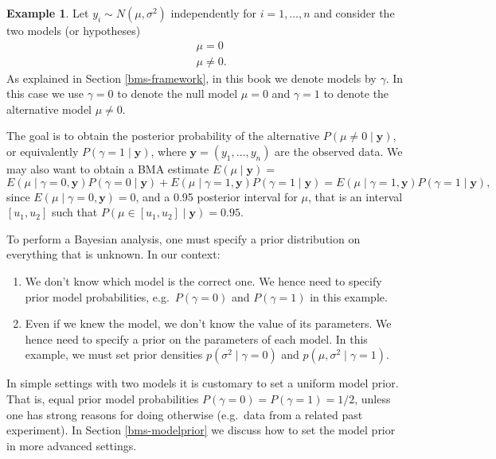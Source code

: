 \documentclass[
]{book}
\newcommand{\by}{\mathbf{y}}
\theoremstyle{definition}
\theoremstyle{definition}
\newtheorem{example}{Example}[chapter]
\theoremstyle{definition}
\theoremstyle{definition}
\theoremstyle{remark}
\begin{document}
\begin{example}
\protect\hypertarget{exm:normalmean}{}\label{exm:normalmean}Let \(y_i \sim N(\mu, \sigma^2)\) independently for \(i=1,\ldots,n\) and consider the two models (or hypotheses)
\begin{align*}
&\mu = 0 \\
&\mu \neq 0.
\end{align*}
As explained in Section \ref{bms-framework}, in this book we denote models by \(\gamma\). In this case we use \(\gamma=0\) to denote the null model \(\mu=0\) and \(\gamma=1\) to denote the alternative model \(\mu \neq 0\).

The goal is to obtain the posterior probability of the alternative \(P(\mu \neq 0 \mid \by)\), or equivalently \(P(\gamma=1 \mid \by)\), where \(\by= (y_1,\ldots,y_n)\) are the observed data. We may also want to obtain a BMA estimate \(E(\mu \mid \by)=\)
\[E(\mu \mid \gamma=0, \by) P(\gamma=0 \mid \by) + E(\mu \mid \gamma=1, \by) P(\gamma=1 \mid \by)= E(\mu \mid \gamma=1, \by) P(\gamma=1 \mid \by),\]
since \(E(\mu \mid \gamma=0, \by)=0\), and a 0.95 posterior interval for \(\mu\), that is an interval \([u_1,u_2]\) such that \(P(\mu \in [u_1,u_2] \mid \by)= 0.95\).

To perform a Bayesian analysis, one must specify a prior distribution on everything that is unknown. In our context:

\begin{enumerate}
\def\labelenumi{\arabic{enumi}.}
\item
  We don't know which model is the correct one. We hence need to specify prior model probabilities, e.g.~\(P(\gamma=0)\) and \(P(\gamma=1)\) in this example.
\item
  Even if we knew the model, we don't know the value of its parameters. We hence need to specify a prior on the parameters of each model. In this example, we must set prior densities \(p(\sigma^2 \mid \gamma=0)\) and \(p(\mu, \sigma^2 \mid \gamma=1)\).
\end{enumerate}

In simple settings with two models it is customary to set a uniform model prior. That is, equal prior model probabilities \(P(\gamma=0)= P(\gamma=1)= 1/2\), unless one has strong reasons for doing otherwise (e.g.~data from a related past experiment).
In Section \ref{bms-modelprior} we discuss how to set the model prior in more advanced settings.


\end{example}
\end{document}
